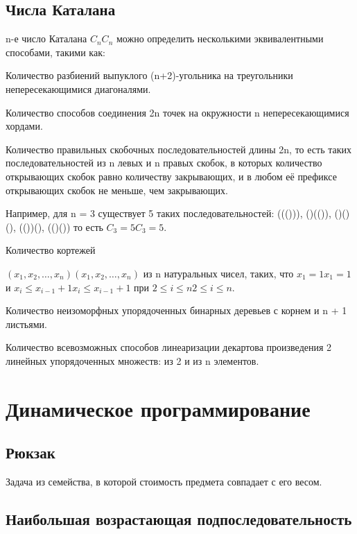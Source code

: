 \documentclass[a4paper]{article}
\begin{document}
\begin{multicols*}{2}
		  \subsection{Числа Каталана}
		  n-е число Каталана ${\displaystyle C_{n}}C_{n}$ можно определить несколькими эквивалентными способами, такими как:
		  
		  Количество разбиений выпуклого (n+2)-угольника на треугольники непересекающимися диагоналями.
		  
		  
		  Количество способов соединения 2n точек на окружности n непересекающимися хордами.
		  
		  
		  Количество правильных скобочных последовательностей длины 2n, то есть таких последовательностей из n левых и n правых скобок, в которых количество открывающих скобок равно количеству закрывающих, и в любом её префиксе открывающих скобок не меньше, чем закрывающих.
		  
		
		  Например, для n = 3 существует 5 таких последовательностей:
		  ((())), ()(()), ()()(), (())(), (()())
		  то есть ${\displaystyle C_{3}=5}C_{3}=5.$
		  
		  Количество кортежей 
		  
		  ${\displaystyle (x_{1},x_{2},\ldots ,x_{n})}{\displaystyle (x_{1},x_{2},\ldots ,x_{n})}$ из n натуральных чисел, таких, что ${\displaystyle x_{1}=1}x_1=1$ и ${\displaystyle x_{i}\leqslant x_{i-1}+1}{\displaystyle x_{i}\leqslant x_{i-1}+1}$ при ${\displaystyle 2\leqslant i\leqslant n}2 \leqslant i \leqslant n$.
		  
		  Количество неизоморфных упорядоченных бинарных деревьев с корнем и n + 1 листьями.
		  
		  Количество всевозможных способов линеаризации декартова произведения 2 линейных упорядоченных множеств: из 2 и из n элементов.
		  \section{Динамическое программирование}
		  \subsection{Рюкзак}
		  Задача из семейства, в которой стоимость предмета совпадает с его весом.
		  
		  \subsection{Наибольшая возрастающая подпоследовательность}
		  

\end{multicols*}
\end{document}
